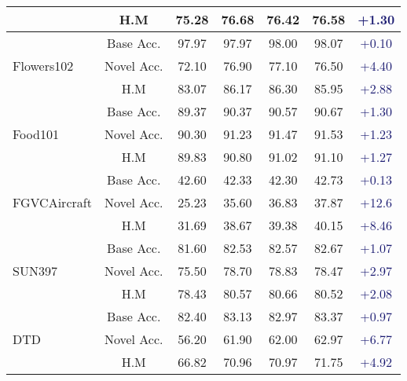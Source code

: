 \documentclass[10pt,twocolumn,letterpaper]{article}
\begin{document}
\begin{table*}[!t]
{\begin{tabular}{lc|cccc|c}
                               & H.M            & 75.28 & 76.68    & 76.42  &  76.58 & \textcolor{MidnightBlue}{{+1.30}}\\
\midrule
\multirow{3}{*}{Flowers102}    & Base Acc.      & 97.97 & 97.97    & 98.00  &98.07&  \textcolor{MidnightBlue}{{+0.10}}\\
                               & Novel Acc.      & 72.10 & 76.90    & 77.10 &76.50 & \textcolor{MidnightBlue}{{+4.40}}\\
                               & H.M             & 83.07 & 86.17    & 86.30  & 85.95& \textcolor{MidnightBlue}{{+2.88}}\\
\midrule
\multirow{3}{*}{Food101}       & Base Acc.       & 89.37 & 90.37    & {90.57}  &90.67&\textcolor{MidnightBlue}{{+1.30}}\\
                               & Novel Acc.      & 90.30 & 91.23    & 91.47  & 91.53&  \textcolor{MidnightBlue}{{+1.23}}\\
                               & H.M            & 89.83 & 90.80    & 91.02  & 91.10& \textcolor{MidnightBlue}{{+1.27}}\\
\midrule
\multirow{3}{*}{FGVCAircraft}  & Base Acc.       & 42.60 & 42.33    & 42.30 & 42.73  &  \textcolor{MidnightBlue}{{+0.13}}\\
                               & Novel Acc.      & 25.23 & 35.60    & 36.83 &37.87   &  \textcolor{MidnightBlue}{{+12.6}}\\
                               & H.M             & 31.69 & 38.67    & 39.38  & 40.15  &  \textcolor{MidnightBlue}{{+8.46}}\\
\midrule
\multirow{3}{*}{SUN397}        & Base Acc.      & 81.60 & 82.53    &  82.57  &82.67 &   \textcolor{MidnightBlue}{{+1.07}}\\
                               & Novel Acc.      & 75.50 & 78.70    &  78.83 &78.47  &  \textcolor{MidnightBlue}{{+2.97}}\\
                               & H.M            & 78.43 & 80.57    &  80.66 &80.52  &  \textcolor{MidnightBlue}{{+2.08}}\\
\midrule
\multirow{3}{*}{DTD}           & Base Acc.       & 82.40 & 83.13    &82.97 &83.37   &  \textcolor{MidnightBlue}{{+0.97}}\\
                               & Novel Acc.      & 56.20 & 61.90    & 62.00 &62.97  &  \textcolor{MidnightBlue}{{+6.77}}\\
                               & H.M            & 66.82 & 70.96    & 70.97 &71.75  & \textcolor{MidnightBlue}{{+4.92}}\\

\end{tabular}}
\end{table*}
\end{document}
